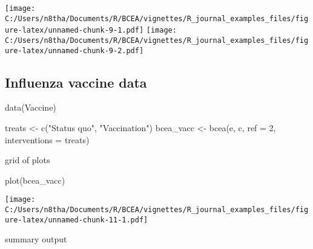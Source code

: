 \documentclass[
]{article}
\newenvironment{Shaded}{\begin{snugshade}}{\end{snugshade}}
\newcommand{\AttributeTok}[1]{\textcolor[rgb]{0.77,0.63,0.00}{#1}}
\newcommand{\DecValTok}[1]{\textcolor[rgb]{0.00,0.00,0.81}{#1}}
\newcommand{\FunctionTok}[1]{\textcolor[rgb]{0.00,0.00,0.00}{#1}}
\newcommand{\NormalTok}[1]{#1}
\newcommand{\OtherTok}[1]{\textcolor[rgb]{0.56,0.35,0.01}{#1}}
\newcommand{\StringTok}[1]{\textcolor[rgb]{0.31,0.60,0.02}{#1}}
\begin{document}
\texttt{[image: C:/Users/n8tha/Documents/R/BCEA/vignettes/R\_journal\_examples\_files/figure-latex/unnamed-chunk-9-1.pdf]}
\texttt{[image: C:/Users/n8tha/Documents/R/BCEA/vignettes/R\_journal\_examples\_files/figure-latex/unnamed-chunk-9-2.pdf]}

\hypertarget{influenza-vaccine-data}{%
\subsection{Influenza vaccine data}\label{influenza-vaccine-data}}

\begin{Shaded}
\begin{Highlighting}[]
\FunctionTok{data}\NormalTok{(Vaccine)}

\NormalTok{treats }\OtherTok{\textless{}{-}} \FunctionTok{c}\NormalTok{(}\StringTok{"Status quo"}\NormalTok{, }\StringTok{"Vaccination"}\NormalTok{)}
\NormalTok{bcea\_vacc }\OtherTok{\textless{}{-}} \FunctionTok{bcea}\NormalTok{(e, c, }\AttributeTok{ref =} \DecValTok{2}\NormalTok{, }\AttributeTok{interventions =}\NormalTok{ treats)}
\end{Highlighting}
\end{Shaded}

grid of plots

\begin{Shaded}
\begin{Highlighting}[]
\FunctionTok{plot}\NormalTok{(bcea\_vacc)}
\end{Highlighting}
\end{Shaded}

\texttt{[image: C:/Users/n8tha/Documents/R/BCEA/vignettes/R\_journal\_examples\_files/figure-latex/unnamed-chunk-11-1.pdf]}

summary output
\end{document}
